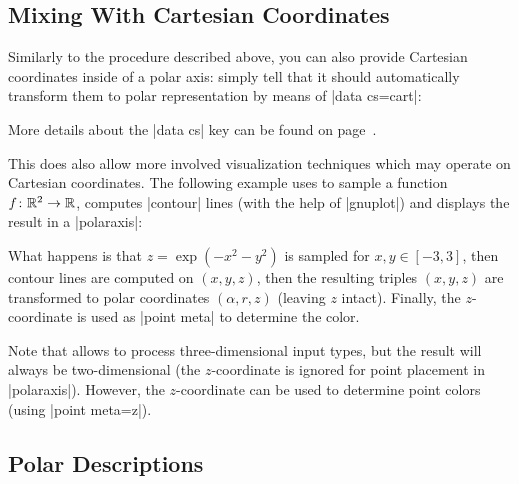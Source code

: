 {\subsection{Mixing With Cartesian Coordinates}
\label{sec:polar:cart}

Similarly to the procedure described above, you can also provide Cartesian
coordinates inside of a polar axis: simply tell \PGFPlots{} that it should
automatically transform them to polar representation by means of
|data cs=cart|:
%
\begin{codeexample}[]
\end{codeexample}
%
\noindent More details about the |data cs| key can be found on
page~\pageref{key:data:cs}.

This does also allow more involved visualization techniques which may operate
on Cartesian coordinates. The following example uses  to
sample a function $f\colon \mathbb{R}^2 \to \mathbb{R}$, computes |contour| lines (with the
help of |gnuplot|) and displays the result in a |polaraxis|:
%
\pgfplotsexpensiveexample
\begin{codeexample}[]
\end{codeexample}
%
\noindent What happens is that $z=\exp(-x^2-y^2)$ is sampled for $x,y \in
[-3,3]$, then contour lines are computed on $(x,y,z)$, then the resulting
triples $(x,y,z)$ are transformed to polar coordinates $(\alpha,r,z)$ (leaving
$z$ intact). Finally, the $z$-coordinate is used as |point meta| to determine
the color.

Note that  allows to process three-dimensional input
types, but the result will always be two-dimensional (the $z$-coordinate is
ignored for point placement in |polaraxis|). However, the $z$-coordinate can be
used to determine point colors (using |point meta=z|).


\subsection{Polar Descriptions}

}
